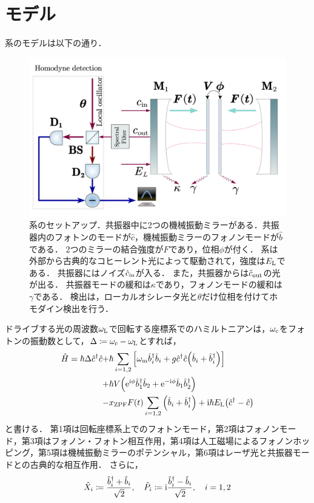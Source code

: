 \documentclass{report}
\begin{document}
    \section{モデル}
      系のモデルは以下の通り．
      \begin{figure}[H]
        \centering
        \includegraphics[width = 0.5\linewidth]{./src/Enhancing_optomechanical_force_sensing_utilizing_synthetic_magnetism/1.png}
        \caption{
          系のセットアップ．共振器中に2つの機械振動ミラーがある．共振器内のフォトンのモードが$\hat{c}$，機械振動ミラーのフォノンモードが$\hat{b}$である．
          2つのミラーの結合強度が$F$であり，位相$\phi$が付く．
          系は外部から古典的なコヒーレント光によって駆動されて，強度は$E_{\mathrm{L}}$である．
          共振器にはノイズ$\hat{c}_{\mathrm{in}}$が入る．
          また，共振器からは$\hat{c}_{\mathrm{out}}$の光が出る．
          共振器モードの緩和は$\kappa$であり，フォノンモードの緩和は$\gamma$である．
          検出は，ローカルオシレータ光と$\theta$だけ位相を付けてホモダイン検出を行う．
        }
      \end{figure}
      ドライブする光の周波数$\omega_{\mathrm{L}}$で回転する座標系でのハミルトニアンは，$\omega_{\mathrm{c}}$をフォトンの振動数として，$\Delta \coloneqq \omega_{\mathrm{c}} - \omega_{\mathrm{L}}$とすれば，
      \begin{align}
        \hat{H} = \hbar\Delta\hat{c}^{\dag}\hat{c} +& \hbar\sum_{i = 1, 2} \qty[\omega_{\mathrm{m}}\hat{b}^{\dag}_i\hat{b}_i + g\hat{c}^{\dag}\hat{c}\qty(\hat{b}_i + \hat{b}^{\dag}_i)] \\ 
        +& \hbar V\qty(\mathrm{e}^{\mathrm{i}\phi}\hat{b}^{\dag}_1\hat{b}_2 + \mathrm{e}^{-\mathrm{i}\phi}\hat{b}_1\hat{b}^{\dag}_2) \\ 
        -& x_{\mathrm{ZPF}}F(t)\sum_{i = 1, 2}\qty(\hat{b}_i + \hat{b}^{\dag}_i) + \mathrm{i}\hbar E_{\mathrm{L}}\qty(\hat{c}^{\dag} - \hat{c})
      \end{align}
      と書ける．
      第1項は回転座標系上でのフォトンモード，第2項はフォノンモード，第3項はフォノン・フォトン相互作用，第4項は人工磁場によるフォノンホッピング，第5項は機械振動ミラーのポテンシャル，第6項はレーザ光と共振器モードとの古典的な相互作用．
      さらに，
      \begin{align}
        \hat{X}_i \coloneqq \frac{\hat{b}^{\dag}_i + \hat{b}_i}{\sqrt{2}}, \quad \hat{P}_i \coloneqq \mathrm{i}\frac{\hat{b}^{\dag}_i - \hat{b}_i}{\sqrt{2}}, \quad i = 1, 2
      \end{align}
\end{document}
